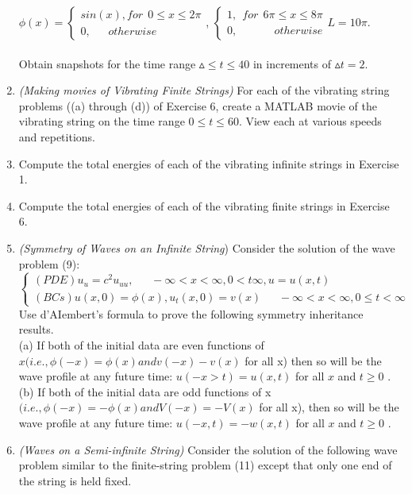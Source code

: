 \documentclass[../main.tex]{subfiles}
\begin{document}
\begin{enumerate}
$\phi(x)=
\begin{cases} 
	sin(x), for~~ 0\leqslant  x\leqslant 2 \pi \\
	0, ~~~~~~~otherwise
\end{cases}$, 
	$\begin{cases} 
		1, ~~for~~ 6\pi \leqslant x \leqslant 8\pi \\	
		0, ~~~~~~~~~~~~~~~otherwise
	\end{cases}
		L=10 \pi$.
\\
\\
Obtain snapshots for the time range $ \vartriangle \leqslant t \leqslant40$ in increments of $\vartriangle t=2$.
	\item
		 \textit{(Making movies of Vibrating Finite Strings)} For each of the vibrating string problems ((a) 
through (d)) of Exercise 6, create a MATLAB movie of the vibrating string on the time range 
$0 \leqslant t \leqslant 60$. View each at various speeds and repetitions.
	\item 
		Compute the total energies of each of the vibrating infinite strings in Exercise 1. 
		\item 
		Compute the total energies of each of the vibrating finite strings in Exercise 6.  
		\item 
		\textit{(Symmetry of Waves on an Infinite String}) Consider the solution of the wave problem (9): 
 $$\begin{cases} 
	(PDE) u_u=c^2 u_{uu}, ~~~~~~~ - \infty< x< \infty, 0<t \infty , u=u(x,t) \\ 
	(BCs) u(x,0)=\phi (x), u_t(x,0)=v(x) ~~~~~~~
	-\infty< x< \infty, 0\leqslant t< \infty 
\end{cases}$$
 Use d'AIembert's formula to prove the following symmetry inheritance results.
 \\ 
(a) If both of the initial data are even functions  of $x (i.e., \phi(-x) = \phi(x) and v(-x) - v(x)$ for 
all x) then so will be the wave profile at any future time: $u(-x>t) = u(x,t)$ for all $x$ and $t \geq 0$ . 
\\
(b) If both of the initial data are odd functions of x $(i.e., \phi(-x) = -\phi(x) and V(-x) = -V(x)$ for 
all x), then so will be the wave profile at any future time: $u(-x, t) = -w(x, t)$ for all $x$ and $t \geq 0$ .
\\ 
		\item 
		\textit{(Waves on a Semi-infinite String)} Consider the solution of the following wave problem similar 
to the finite-string problem (11) except that only one end of the string is held fixed. 

\end{enumerate}
\end{document}
